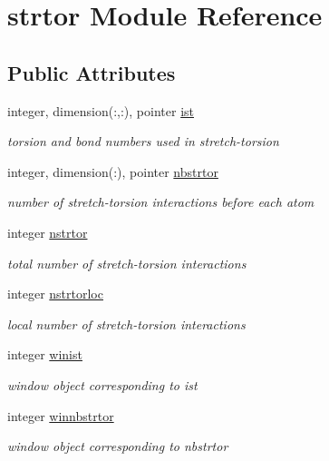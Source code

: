\hypertarget{classstrtor}{\section{strtor Module Reference}
\label{classstrtor}
}
\subsection*{Public Attributes}
\begin{DoxyCompactItemize}
\item 
integer, dimension(\-:,\-:), pointer \hyperlink{classstrtor_a20a3601a750b703431d458c6ba264647}{ist}
\begin{DoxyCompactList}\small\item\em torsion and bond numbers used in stretch-\/torsion \end{DoxyCompactList}\item 
integer, dimension(\-:), pointer \hyperlink{classstrtor_ad92798bea203d341d2c7fdf4f53d729d}{nbstrtor}
\begin{DoxyCompactList}\small\item\em number of stretch-\/torsion interactions before each atom \end{DoxyCompactList}\item 
integer \hyperlink{classstrtor_a971cdce99050711499c0f32a110c42b8}{nstrtor}
\begin{DoxyCompactList}\small\item\em total number of stretch-\/torsion interactions \end{DoxyCompactList}\item 
integer \hyperlink{classstrtor_a66396ecb7c8062d13dce1e65367dec2f}{nstrtorloc}
\begin{DoxyCompactList}\small\item\em local number of stretch-\/torsion interactions \end{DoxyCompactList}\item 
integer \hyperlink{classstrtor_aa10171ea7624c58c069bd729d8ea202a}{winist}
\begin{DoxyCompactList}\small\item\em window object corresponding to ist \end{DoxyCompactList}\item 
integer \hyperlink{classstrtor_a3c7d3de6901768d3931371425c04b1e6}{winnbstrtor}
\begin{DoxyCompactList}\small\item\em window object corresponding to nbstrtor \end{DoxyCompactList}\item 

\end{DoxyCompactItemize}
